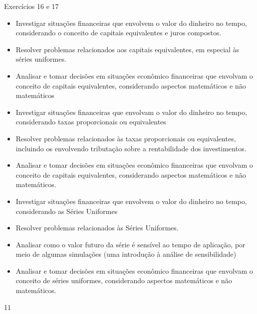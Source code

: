 \begin{objectives}{Exercícios 16 e 17}
{
  
  \begin{itemize}
    \item Investigar situações financeiras que envolvem o valor do dinheiro no tempo, considerando o conceito de capitais equivalentes e juros compostos.
    \item Resolver problemas relacionados aos capitais equivalentes, em especial às séries uniformes.
    \item Analisar e tomar decisões em situações econômico financeiras que envolvam o conceito de capitais equivalentes, considerando aspectos matemáticos e não matemáticos

  \end{itemize}  
  \begin{itemize}
  \item Investigar situações financeiras que envolvam o valor do dinheiro no tempo, considerando taxas proporcionais ou equivalentes
  \item Resolver problemas relacionados às taxas proporcionais ou equivalentes, incluindo os envolvendo tributação sobre a rentabilidade dos investimentos.
  \item Analisar e tomar decisões em situações econômico financeiras que envolvam o conceito de capitais equivalentes, considerando aspectos matemáticos e não matemáticos.
  \end{itemize}

  \begin{itemize}
  \item Investigar situações financeiras que envolvem o valor do dinheiro no tempo, considerando as Séries Uniformes
  \item Resolver problemas relacionados às Séries Uniformes.
  \item Analisar como o valor futuro da série é sensível ao tempo de aplicação, por meio de algumas simulações (uma introdução à análise de sensibilidade)
  \item Analisar e tomar decisões em situações econômico financeiras que envolvam o conceito de séries uniformes, considerando aspectos matemáticos e não matemáticos.
  \end{itemize}

}{1}{1}
\end{objectives}
